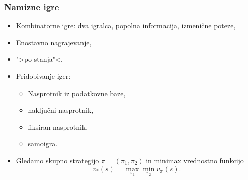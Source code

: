 \documentclass{beamer}    %
\begin{document}
\begin{frame}
    \frametitle{Namizne igre}
    \begin{itemize}
        \item Kombinatorne igre: dva igralca, popolna informacija, izmenične poteze,
        \item Enostavno nagrajevanje,
        \item ">po-stanja"<,
        \item Pridobivanje iger: 
                \begin{itemize}
                    \item Nasprotnik iz podatkovne baze, 
                    \item naključni nasprotnik,
                    \item fiksiran nasprotnik, 
                    \item samoigra.
                \end{itemize}
        \item Gledamo skupno strategijo $\pi = (\pi_1, \pi_2)$ in minimax vrednostno funkcijo
        $$
        v_*(s) = \max_{\pi_1} \min_{\pi_2} v_\pi(s).
        $$
    \end{itemize}
\end{frame}


\end{document}
